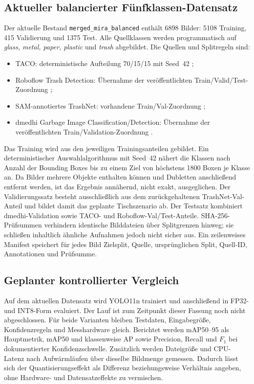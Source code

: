 \subsection{Aktueller balancierter Fünfklassen-Datensatz}
Der aktuelle Bestand \texttt{merged\_mira\_balanced} enthält 6898 Bilder: 5108 Training, 415 Validierung und 1375 Test. Alle Quellklassen werden programmatisch auf \textit{glass, metal, paper, plastic} und \textit{trash} abgebildet. Die Quellen und Splitregeln sind:
\begin{itemize}
    \item TACO: deterministische Aufteilung 70/15/15 mit Seed~42 \cite{proenca2020taco};
    \item Roboflow Trash Detection: Übernahme der veröffentlichten Train/Valid/Test-Zuordnung \cite{roboflow2023trash};
    \item SAM-annotiertes TrashNet: vorhandene Train/Val-Zuordnung \cite{yang2016classification,kirillov2023segment};
    \item dmedhi Garbage Image Classification/Detection: Übernahme der veröffentlichten Train/Validation-Zuordnung \cite{dmedhiGarbageDataset}.
\end{itemize}

Das Training wird aus den jeweiligen Trainingsanteilen gebildet. Ein deterministischer Auswahlalgorithmus mit Seed~42 nähert die Klassen nach Anzahl der Bounding Boxes bis zu einem Ziel von höchstens 1800 Boxen je Klasse an. Da Bilder mehrere Objekte enthalten können und Dubletten anschließend entfernt werden, ist das Ergebnis annähernd, nicht exakt, ausgeglichen. Der Validierungssatz besteht ausschließlich aus dem zurückgehaltenen TrashNet-Val-Anteil und bildet damit das geplante Tischszenario ab. Der Testsatz kombiniert dmedhi-Validation sowie TACO- und Roboflow-Val/Test-Anteile. SHA-256-Prüfsummen verhindern identische Bilddateien über Splitgrenzen hinweg; sie schließen inhaltlich ähnliche Aufnahmen jedoch nicht sicher aus. Ein zeilenweises Manifest speichert für jedes Bild Zielsplit, Quelle, ursprünglichen Split, Quell-ID, Annotationen und Prüfsumme.

\subsection{Geplanter kontrollierter Vergleich}
Auf dem aktuellen Datensatz wird YOLO11n trainiert und anschließend in FP32- und INT8-Form evaluiert. Der Lauf ist zum Zeitpunkt dieser Fassung noch nicht abgeschlossen. Für beide Varianten bleiben Testdaten, Eingabegröße, Konfidenzregeln und Messhardware gleich. Berichtet werden mAP50--95 als Hauptmetrik, mAP50 und klassenweise AP sowie Precision, Recall und $F_1$ bei dokumentierter Konfidenzschwelle. Zusätzlich werden Dateigröße und CPU-Latenz nach Aufwärmläufen über dieselbe Bildmenge gemessen. Dadurch lässt sich der Quantisierungseffekt als Differenz beziehungsweise Verhältnis angeben, ohne Hardware- und Datensatzeffekte zu vermischen.

